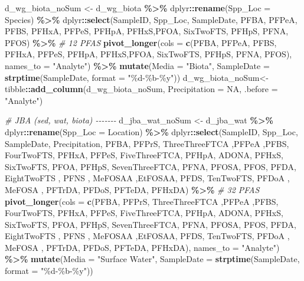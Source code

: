 \documentclass[
]{article}
\newenvironment{Shaded}{\begin{snugshade}}{\end{snugshade}}
\newcommand{\AttributeTok}[1]{\textcolor[rgb]{0.13,0.29,0.53}{#1}}
\newcommand{\CommentTok}[1]{\textcolor[rgb]{0.56,0.35,0.01}{\textit{#1}}}
\newcommand{\ConstantTok}[1]{\textcolor[rgb]{0.56,0.35,0.01}{#1}}
\newcommand{\FunctionTok}[1]{\textcolor[rgb]{0.13,0.29,0.53}{\textbf{#1}}}
\newcommand{\NormalTok}[1]{#1}
\newcommand{\OtherTok}[1]{\textcolor[rgb]{0.56,0.35,0.01}{#1}}
\newcommand{\SpecialCharTok}[1]{\textcolor[rgb]{0.81,0.36,0.00}{\textbf{#1}}}
\newcommand{\StringTok}[1]{\textcolor[rgb]{0.31,0.60,0.02}{#1}}
\begin{document}
\begin{Shaded}
\begin{Highlighting}[]
\NormalTok{d\_wg\_biota\_noSum }\OtherTok{\textless{}{-}}\NormalTok{ d\_wg\_biota }\SpecialCharTok{\%\textgreater{}\%}
\NormalTok{  dplyr}\SpecialCharTok{::}\FunctionTok{rename}\NormalTok{(}\AttributeTok{Spp\_Loc =}\NormalTok{ Species) }\SpecialCharTok{\%\textgreater{}\%}
\NormalTok{  dplyr}\SpecialCharTok{::}\FunctionTok{select}\NormalTok{(SampleID, Spp\_Loc, SampleDate, PFBA, PFPeA, PFBS, PFHxA, PFPeS,}
\NormalTok{         PFHpA, PFHxS,PFOA, SixTwoFTS, PFHpS, PFNA, PFOS) }\SpecialCharTok{\%\textgreater{}\%} \CommentTok{\# 12 PFAS}
  \FunctionTok{pivot\_longer}\NormalTok{(}\AttributeTok{cols =} \FunctionTok{c}\NormalTok{(PFBA, PFPeA, PFBS, PFHxA, PFPeS,}
\NormalTok{         PFHpA, PFHxS,PFOA, SixTwoFTS, PFHpS, PFNA, PFOS),}
         \AttributeTok{names\_to =} \StringTok{"Analyte"}\NormalTok{) }\SpecialCharTok{\%\textgreater{}\%}
  \FunctionTok{mutate}\NormalTok{(}\AttributeTok{Media =} \StringTok{"Biota"}\NormalTok{,}
         \AttributeTok{SampleDate =} \FunctionTok{strptime}\NormalTok{(SampleDate, }\AttributeTok{format =} \StringTok{"\%d{-}\%b{-}\%y"}\NormalTok{))}
\NormalTok{d\_wg\_biota\_noSum}\OtherTok{\textless{}{-}}\NormalTok{tibble}\SpecialCharTok{::}\FunctionTok{add\_column}\NormalTok{(d\_wg\_biota\_noSum, }\AttributeTok{Precipitation =} \ConstantTok{NA}\NormalTok{, }\AttributeTok{.before =} \StringTok{"Analyte"}\NormalTok{)}

\CommentTok{\# JBA (sed, wat, biota) {-}{-}{-}{-}{-}{-}{-}}
\NormalTok{d\_jba\_wat\_noSum }\OtherTok{\textless{}{-}}\NormalTok{ d\_jba\_wat }\SpecialCharTok{\%\textgreater{}\%}
\NormalTok{  dplyr}\SpecialCharTok{::}\FunctionTok{rename}\NormalTok{(}\AttributeTok{Spp\_Loc =}\NormalTok{ Location) }\SpecialCharTok{\%\textgreater{}\%}
\NormalTok{  dplyr}\SpecialCharTok{::}\FunctionTok{select}\NormalTok{(SampleID, Spp\_Loc, SampleDate, Precipitation, }
\NormalTok{                PFBA, PFPrS,  ThreeThreeFTCA ,PFPeA ,PFBS, }
\NormalTok{                FourTwoFTS, PFHxA, PFPeS, FiveThreeFTCA, PFHpA,}
\NormalTok{                ADONA, PFHxS, SixTwoFTS, PFOA, PFHpS,}
\NormalTok{                SevenThreeFTCA, PFNA, PFOSA, PFOS, PFDA,}
\NormalTok{                EightTwoFTS , PFNS , MeFOSAA ,EtFOSAA, PFDS, }
\NormalTok{                TenTwoFTS, PFDoA , MeFOSA , PFTrDA, PFDoS,}
\NormalTok{                PFTeDA, PFHxDA) }\SpecialCharTok{\%\textgreater{}\%} \CommentTok{\# 32 PFAS}
  \FunctionTok{pivot\_longer}\NormalTok{(}\AttributeTok{cols =} \FunctionTok{c}\NormalTok{(PFBA, PFPrS,  ThreeThreeFTCA ,PFPeA ,PFBS, }
\NormalTok{                FourTwoFTS, PFHxA, PFPeS, FiveThreeFTCA, PFHpA,}
\NormalTok{                ADONA, PFHxS, SixTwoFTS, PFOA, PFHpS,}
\NormalTok{                SevenThreeFTCA, PFNA, PFOSA, PFOS, PFDA,}
\NormalTok{                EightTwoFTS , PFNS , MeFOSAA ,EtFOSAA, PFDS, }
\NormalTok{                TenTwoFTS, PFDoA , MeFOSA , PFTrDA, PFDoS,}
\NormalTok{                PFTeDA, PFHxDA),}
         \AttributeTok{names\_to =} \StringTok{"Analyte"}\NormalTok{) }\SpecialCharTok{\%\textgreater{}\%}
  \FunctionTok{mutate}\NormalTok{(}\AttributeTok{Media =} \StringTok{"Surface Water"}\NormalTok{,}
         \AttributeTok{SampleDate =} \FunctionTok{strptime}\NormalTok{(SampleDate, }\AttributeTok{format =} \StringTok{"\%d{-}\%b{-}\%y"}\NormalTok{))}


\end{Highlighting}
\end{Shaded}
\end{document}
